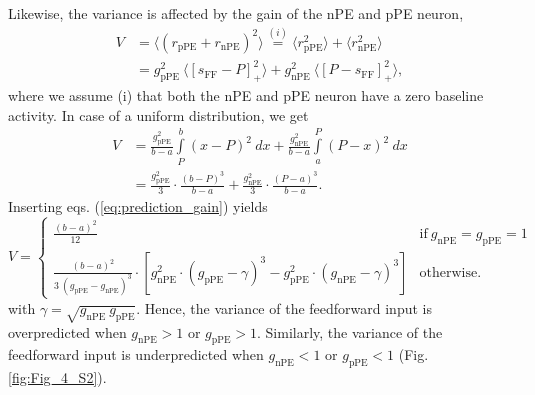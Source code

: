 \documentclass[10pt,a4paper]{article}
\begin{document}
Likewise, the variance is affected by the gain of the nPE and pPE neuron,
%
\begin{align}
\label{eq:condition_variance_gain}
V &= \langle \left(r_\mathrm{pPE} + r_\mathrm{nPE}\right)^2 \rangle \overset{(i)}{=} \langle r_\mathrm{pPE}^2 \rangle + \langle r_\mathrm{nPE}^2 \rangle \nonumber\\
&=g_\mathrm{pPE}^2\ \langle \left[ s_\mathrm{FF}-P \right]_+^2 \rangle + g_\mathrm{nPE}^2\ \langle \left[ P-s_\mathrm{FF} \right]_+^2 \rangle,
\end{align}
%
where we assume (i) that both the nPE and pPE neuron have a zero baseline activity. In case of a uniform distribution, we get
%
\begin{align}
V &= \frac{g_\mathrm{pPE}^2}{b-a} \int\limits_P^b (x-P)^2\ dx + \frac{g_\mathrm{nPE}^2}{b-a} \int\limits_a^P (P-x)^2\ dx \\
   &= \frac{g_\mathrm{pPE}^2}{3} \cdot \frac{(b-P)^3}{b-a} + \frac{g_\mathrm{nPE}^2}{3} \cdot \frac{(P-a)^3}{b-a}. \nonumber
\end{align}
%
Inserting eqs. (\ref{eq:prediction_gain}) yields
%
\begin{equation}
\label{eq:variance_gain}
    V=
    \begin{cases}
      \frac{(b - a)^2}{12} & \text{if}\ g_\mathrm{nPE} = g_\mathrm{pPE} = 1 \\
      \frac{(b-a)^2}{3\ (g_\mathrm{pPE} - g_\mathrm{nPE})^3} \cdot \left[ g_\mathrm{nPE}^2 \cdot( g_\mathrm{pPE} - \gamma)^3 - g_\mathrm{pPE}^2 \cdot (g_\mathrm{nPE} - \gamma)^3\right] & \text{otherwise.}
    \end{cases}
\end{equation}
%
with $\gamma = \sqrt{g_\mathrm{nPE}\ g_\mathrm{pPE}}$. Hence, the variance of the feedforward input is overpredicted when $g_\mathrm{nPE}>1$ or $g_\mathrm{pPE}>1$. Similarly, the variance of the feedforward input is underpredicted when $g_\mathrm{nPE} < 1$ or $g_\mathrm{pPE} < 1$ (Fig. \ref{fig:Fig_4_S2}).
\end{document}
